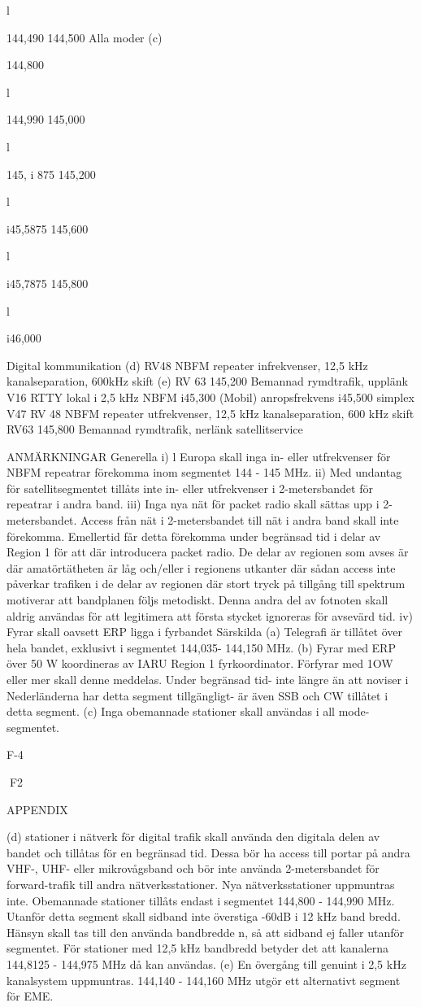 l

144,490
144,500
Alla moder (c)

144,800

l

144,990
145,000

l

145, i 875
145,200

l

i45,5875
145,600

l

i45,7875
145,800

l

i46,000

Digital kommunikation (d)
RV48
NBFM repeater infrekvenser, 12,5 kHz kanalseparation, 600kHz skift (e)
RV 63
145,200
Bemannad rymdtrafik, upplänk
V16
RTTY lokal
i 2,5 kHz NBFM
i45,300
(Mobil) anropsfrekvens
i45,500
simplex
V47
RV 48
NBFM repeater utfrekvenser, 12,5 kHz kanalseparation, 600 kHz skift
RV63
145,800
Bemannad rymdtrafik, nerlänk
satellitservice

ANMÄRKNINGAR
Generella
i) l Europa skall inga in- eller utfrekvenser för NBFM repeatrar förekomma inom segmentet 144 - 145 MHz.
ii) Med undantag för satellitsegmentet tillåts inte in- eller utfrekvenser i 2-metersbandet för repeatrar i andra band.
iii) Inga nya nät för packet radio skall sättas upp i 2-metersbandet.
Access från nät i 2-metersbandet till nät i andra band skall inte förekomma. Emellertid får detta förekomma
under begränsad tid i delar av Region 1 för att där introducera packet radio. De delar av regionen som avses är
där amatörtätheten är låg och/eller i regionens utkanter där sådan access inte påverkar trafiken i de delar av
regionen där stort tryck på tillgång till spektrum motiverar att bandplanen följs metodiskt. Denna andra del av
fotnoten skall aldrig användas för att legitimera att första stycket ignoreras för avsevärd tid.
iv) Fyrar skall oavsett ERP ligga i fyrbandet
Särskilda
(a) Telegrafi är tillåtet över hela bandet, exklusivt i segmentet 144,035- 144,150 MHz.
(b) Fyrar med ERP över 50 W koordineras av IARU Region 1 fyrkoordinator. Förfyrar med 1OW eller mer skall denne
meddelas. Under begränsad tid- inte längre än att noviser i Nederländerna har detta segment tillgängligt- är
även SSB och CW tillåtet i detta segment.
(c) Inga obemannade stationer skall användas i all mode-segmentet.

F-4

F2

APPENDIX

(d) stationer i nätverk för digital trafik skall använda den digitala delen av bandet och tillåtas för en begränsad tid.
Dessa bör ha access till portar på andra VHF-, UHF- eller mikrovågsband och bör inte använda 2-metersbandet
för forward-trafik till andra nätverksstationer. Nya nätverksstationer uppmuntras inte. Obemannade stationer
tillåts endast i segmentet 144,800 - 144,990 MHz. Utanför detta segment skall sidband inte överstiga -60dB i 12
kHz band bredd. Hänsyn skall tas till den använda bandbredde n, så att sidband ej faller utanför segmentet. För
stationer med 12,5 kHz bandbredd betyder det att kanalerna 144,8125 - 144,975 MHz då kan användas.
(e) En övergång till genuint i 2,5 kHz kanalsystem uppmuntras.
144,140 - 144,160 MHz utgör ett alternativt segment för EME.

